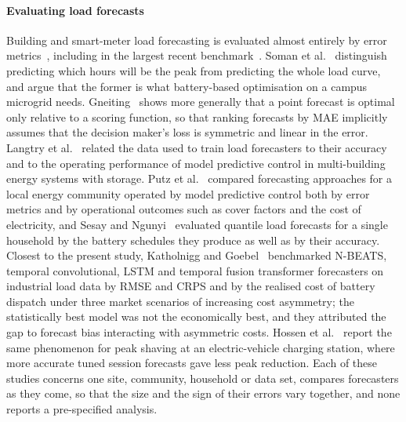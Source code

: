 \paragraph{Evaluating load forecasts} Building and smart-meter load forecasting is evaluated almost entirely by error metrics~\cite{hong2016probabilistic,wang2019smartmeter}, including in the largest recent benchmark~\cite{emami2023buildingsbench}. Soman et al.~\cite{soman2020peak} distinguish predicting which hours will be the peak from predicting the whole load curve, and argue that the former is what battery-based optimisation on a campus microgrid needs. Gneiting~\cite{gneiting2011point} shows more generally that a point forecast is optimal only relative to a scoring function, so that ranking forecasts by MAE implicitly assumes that the decision maker's loss is symmetric and linear in the error. Langtry et al.~\cite{langtry2024data} related the data used to train load forecasters to their accuracy and to the operating performance of model predictive control in multi-building energy systems with storage. Putz et al.~\cite{putz2023truevalue} compared forecasting approaches for a local energy community operated by model predictive control both by error metrics and by operational outcomes such as cover factors and the cost of electricity, and Sesay and Ngunyi~\cite{sesay2026quantile} evaluated quantile load forecasts for a single household by the battery schedules they produce as well as by their accuracy. Closest to the present study, Katholnigg and Goebel~\cite{katholnigg2025impact} benchmarked N-BEATS, temporal convolutional, LSTM and temporal fusion transformer forecasters on industrial load data by RMSE and CRPS and by the realised cost of battery dispatch under three market scenarios of increasing cost asymmetry; the statistically best model was not the economically best, and they attributed the gap to forecast bias interacting with asymmetric costs. Hossen et al.~\cite{hossen2026ptoev} report the same phenomenon for peak shaving at an electric-vehicle charging station, where more accurate tuned session forecasts gave less peak reduction. Each of these studies concerns one site, community, household or data set, compares forecasters as they come, so that the size and the sign of their errors vary together, and none reports a pre-specified analysis.

